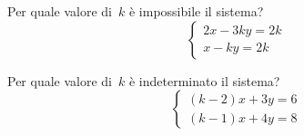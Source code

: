 \begin{esercizio}
 \label{ese:22.37}
Per quale valore di~$k$ è impossibile il sistema?
\[\left\{\begin{array}{l}2x-3ky=2k\\x-ky=2k \end{array}\right.\]
\end{esercizio}

\begin{esercizio}
 \label{ese:22.38}
Per quale valore di~$k$ è indeterminato il sistema?
\[\left\{\begin{array}{l}(k-2)x+3y=6 \\(k-1)x+4y=8 \end{array}\right.\]
\end{esercizio}

